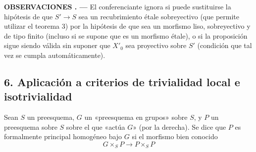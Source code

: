 \documentclass[11pt,twoside,openany]{book}
\numberwithin{equation}{section}
\theoremstyle{plain}
\theoremstyle{definition}
\theoremstyle{remark}
\newcommand{\result}[2]{%
  \par\medskip\noindent\textbf{#1%
  \if\relax\detokenize{#2}\relax\else\space#2\fi. ---}\enspace
}
\theoremstyle{plain}
\theoremstyle{definition}
\theoremstyle{remark}
\begin{document}
\result{OBSERVACIONES}{} El conferenciante ignora si puede sustituirse la
hipótesis de que $S'\longrightarrow S$ sea un recubrimiento étale sobreyectivo
(que permite utilizar el teorema 3) por la hipótesis de que sea un morfismo
liso, sobreyectivo y de tipo finito (incluso si se supone que es un morfismo
étale), o si la proposición sigue siendo válida sin suponer que $X'_0$ sea
proyectivo sobre $S'$ (condición que tal vez se cumpla automáticamente).

\subsection*{6. Aplicación a criterios de trivialidad local e isotrivialidad}

Sean $S$ un preesquema, $G$ un «preesquema en grupos» sobre $S$, y $P$ un
preesquema sobre $S$ sobre el que «actúa $G$» (por la derecha). Se dice que $P$
es formalmente principal homogéneo bajo $G$ si el morfismo bien conocido
\[
  G\times_SP\longrightarrow P\times_SP
\]
\end{document}
